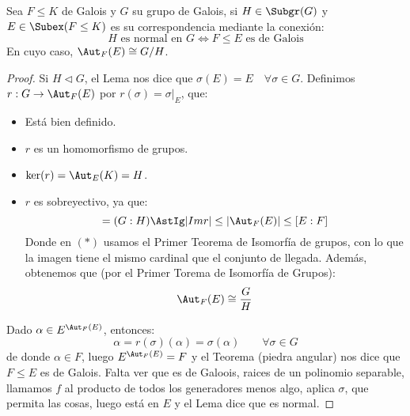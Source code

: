 \begin{teo}
    Sea $F\leq K$ de Galois y $G$ su grupo de Galois, si $H\in \Subgr(G)$ y $E\in \Subex(F\leq K)$ es su correspondencia mediante la conexión:
    \begin{equation*}
        H \text{\ es normal en\ } G \Longleftrightarrow F\leq E \text{\ es de Galois}
    \end{equation*}
    En cuyo caso, $\Aut_F(E)\cong G/H$.
    \begin{proof}
        Si $H\lhd G$, el Lema nos dice que $\sigma(E) = E\quad \forall \sigma\in G$. Definimos $r:G\to \Aut_F(E)$ por $r(\sigma) = \sigma\big|_{E}$, que:
        \begin{itemize}
            \item Está bien definido.
            \item $r$ es un homomorfismo de grupos.
            \item $\ker(r) = \Aut_E(K)  = H$.
            \item $r$ es sobreyectivo, ya que:
                \begin{equation*}
                    [E:F] = (G:H) \AstIg |Im r|\leq |\Aut_F(E)| \leq [E:F]
                \end{equation*}
                Donde en $(\ast)$ usamos el Primer Teorema de Isomorfía de grupos, con lo que la imagen tiene el mismo cardinal que el conjunto de llegada. Además, obtenemos que (por el Primer Torema de Isomorfía de Grupos):
                \begin{equation*}
                    \Aut_F(E) \cong \dfrac{G}{H}
                \end{equation*}
        \end{itemize}
        Dado $\alpha \in E^{\Aut_F(E)}$, entonces: 
        \begin{equation*}
            \alpha = r(\sigma)(\alpha) = \sigma(\alpha) \qquad \forall \sigma\in G
        \end{equation*}
        de donde $\alpha\in F$, luego $E^{\Aut_F(E)} = F$ y el Teorema (piedra angular) nos dice que $F\leq E$ es de Galois. %
        Falta ver que es de Galoois, raices de un polinomio separable, llamamos $f$ al producto de todos los generadores menos algo, aplica $\sigma$, que permita las cosas, luego está en $E$ y el Lema dice que es normal.
    \end{proof}
\end{teo}
